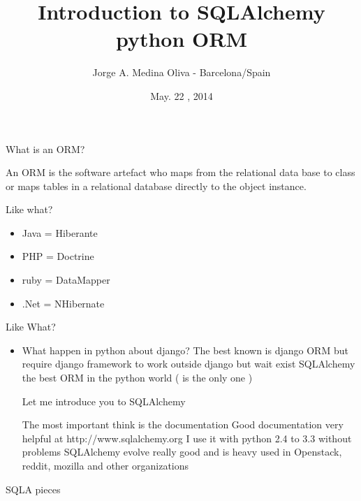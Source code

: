 \documentclass[seagull]{beamer}
\author{Jorge A. Medina Oliva - Barcelona/Spain}
\title{Introduction to SQLAlchemy python ORM}
\date{May. 22 , 2014}
\begin{document}
\begin{frame}
\titlepage
\end{frame}


\begin{frame}{What is an ORM?}

An ORM is the software artefact who maps from the relational data base to class 
or maps tables in a relational database directly to the object instance.

\end{frame}

\begin{frame}{Like what?}
\begin{itemize}
	\item Java = Hiberante
	\item PHP = Doctrine
	\item ruby = DataMapper
	\item .Net = NHibernate
\end{itemize}
\end{frame}

\begin{frame}{Like What?}
\begin{itemize}
	\item What happen in python about django?
The best known is django ORM but require django framework to work outside django
but wait exist SQLAlchemy the best ORM in the python world ( is the only one )

Let me introduce you to SQLAlchemy

The most important think is the documentation
Good documentation very helpful at http://www.sqlalchemy.org
I use it with python 2.4 to  3.3 without problems
SQLAlchemy evolve really good and is heavy used in Openstack, reddit, mozilla and other organizations
\end{itemize}
\end{frame}

\begin{frame}{SQLA pieces}
\centering{}
\end{frame}

\begin{frame}

\end{frame}
\end{document}
